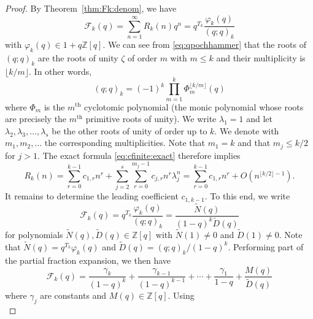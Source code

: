 \documentclass[11pt]{article}
\theoremstyle{plain}
\theoremstyle{definition}
\begin{document}
\begin{proof}
  By Theorem~\ref{thm:Fk:denom}, we have
  \begin{equation*}
    \mathcal{F}_k (q) = \sum_{n = 1}^{\infty} R_k (n) q^n = q^{T_k} 
     \frac{\varphi_k (q)}{(q ; q)_k}
  \end{equation*}
  with $\varphi_k (q) \in 1 + q\mathbb{Z} [q]$. We can see from
  \eqref{eq:qpochhammer} that the roots of $(q ; q)_k$ are the roots of unity
  $\zeta$ of order $m$ with $m \leq k$ and their multiplicity is $\lfloor
  k / m \rfloor$. In other words,
  \begin{equation*}
    (q ; q)_k = (- 1)^k \prod_{m = 1}^k \Phi_m^{\lfloor k / m \rfloor} (q)
  \end{equation*}
  where $\Phi_m$ is the $m^{\text{th}}$ cyclotomic polynomial (the monic
  polynomial whose roots are precisely the $m^{\text{th}}$ primitive roots of
  unity). We write $\lambda_1 = 1$ and let $\lambda_2, \lambda_3, \ldots,
  \lambda_s$ be the other roots of unity of order up to $k$. We denote with
  $m_1, m_2, \ldots$ the corresponding multiplicities. Note that $m_1 = k$ and
  that $m_j \leq k / 2$ for $j > 1$. The exact formula
  \eqref{eq:cfinite:exact} therefore implies
  \begin{equation}
    R_k (n) = \sum_{r = 0}^{k - 1} c_{1, r} n^r + \sum_{j = 2}^s \sum_{r =
    0}^{m_j - 1} c_{j, r} n^r \lambda_j^n = \sum_{r = 0}^{k - 1} c_{1, r} n^r
    + O (n^{\lfloor k / 2 \rfloor - 1}) . \label{eq:Rk:asy:1}
  \end{equation}
  It remains to determine the leading coefficient $c_{1, k - 1}$. To this end,
  we write
  \begin{equation*}
    \mathcal{F}_k (q) = q^{T_k}  \frac{\varphi_k (q)}{(q ; q)_k} =
     \frac{\tilde{N} (q)}{(1 - q)^k \tilde{D} (q)}
  \end{equation*}
  for polynomials $\tilde{N} (q), \tilde{D} (q) \in \mathbb{Z} [q]$ with
  $\tilde{N} (1) \neq 0$ and $\tilde{D} (1) \neq 0$. Note that $\tilde{N} (q)
  = q^{T_k} \varphi_k (q)$ and $\tilde{D} (q) = (q ; q)_k / (1 - q)^k$.
  Performing part of the partial fraction expansion, we then have
  \begin{equation*}
    \mathcal{F}_k (q) = \frac{\gamma_k}{(1 - q)^k} + \frac{\gamma_{k - 1}}{(1
     - q)^{k - 1}} + \cdots + \frac{\gamma_1}{1 - q} + \frac{M (q)}{\tilde{D}
     (q)}
  \end{equation*}
  where $\gamma_j$ are constants and $M (q) \in \mathbb{Z} [q]$. Using
  \begin{equation*}

\end{equation*}
\end{proof}
\end{document}
